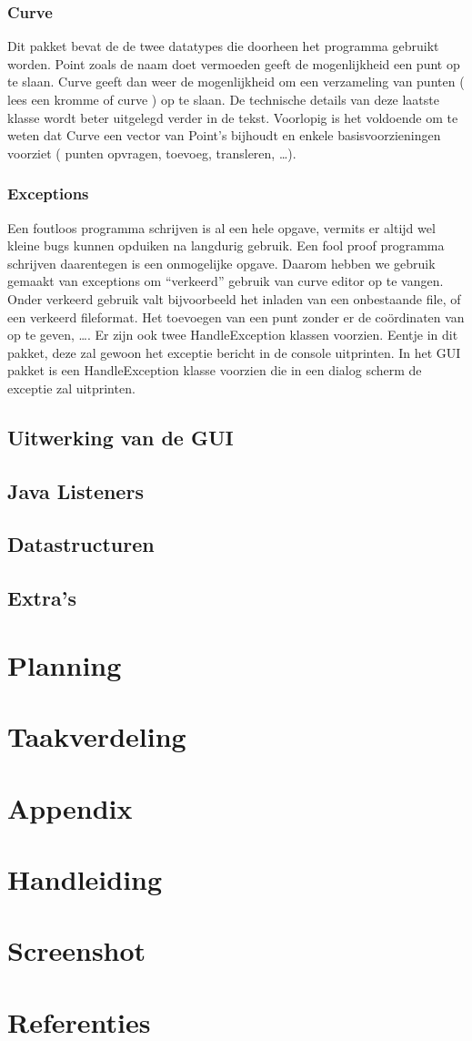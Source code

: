\documentclass[a4paper,11pt,oneside, titlepage]{article}
\begin{document}
\subsubsection{Curve}
Dit pakket bevat de de twee datatypes die doorheen het programma gebruikt worden. Point zoals
de naam doet vermoeden geeft de mogenlijkheid een punt op te slaan. Curve geeft dan weer de
mogenlijkheid om een verzameling van punten ( lees een kromme of curve ) op te slaan. De
technische details van deze laatste klasse wordt beter uitgelegd verder in de tekst. 
Voorlopig is het voldoende om te weten dat Curve een vector van Point's bijhoudt en enkele
basisvoorzieningen voorziet ( punten opvragen, toevoeg, transleren, \ldots ).
\subsubsection{Exceptions}
Een foutloos programma schrijven is al een hele opgave, vermits er altijd wel kleine bugs
kunnen opduiken na langdurig gebruik. Een fool proof programma schrijven daarentegen is een
onmogelijke opgave. Daarom hebben we gebruik gemaakt van exceptions om ``verkeerd'' gebruik van
curve editor op te vangen. Onder verkeerd gebruik valt bijvoorbeeld het inladen van een
onbestaande file, of een verkeerd fileformat. Het toevoegen van een punt zonder er de 
co\"ordinaten van op te geven, \ldots.\newline \newline
Er zijn ook twee HandleException klassen voorzien. Eentje in dit pakket, deze zal gewoon 
het exceptie bericht in de console uitprinten. In het GUI pakket is een HandleException klasse
voorzien die in een dialog scherm de exceptie zal uitprinten.
\subsection{Uitwerking van de GUI}
\subsection{Java Listeners}
\subsection{Datastructuren}
\subsection{Extra's}
\newpage
\section{Planning}
\newpage
\section{Taakverdeling}
\newpage
\section{Appendix}
\appendix
\section{Handleiding}
\section{Screenshot}
\section{Referenties}
\end{document}
